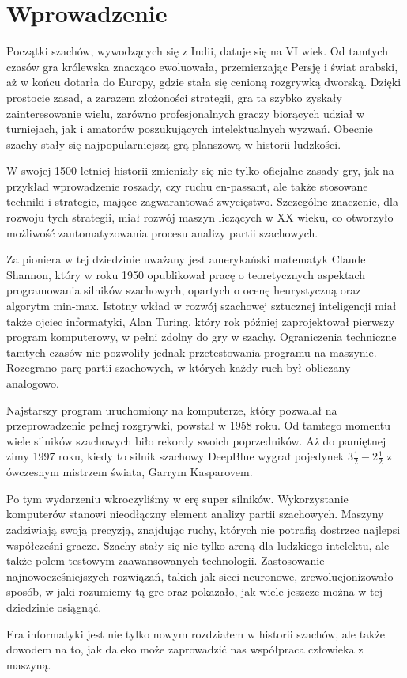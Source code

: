 \section{Wprowadzenie}
\label{sec:wprowadzenie}

Początki szachów, wywodzących się z Indii, datuje się na VI wiek.
Od tamtych czasów gra królewska znacząco ewoluowała, przemierzając Persję i świat arabski, aż w końcu dotarła do Europy, gdzie stała się cenioną rozgrywką dworską.
Dzięki prostocie zasad, a zarazem złożoności strategii, gra ta szybko zyskały zainteresowanie wielu, zarówno profesjonalnych graczy biorących udział w turniejach, jak i amatorów poszukujących intelektualnych wyzwań.
Obecnie szachy stały się najpopularniejszą grą planszową w historii ludzkości.


W swojej 1500-letniej historii zmieniały się nie tylko oficjalne zasady gry, jak na przykład wprowadzenie roszady, czy ruchu en-passant, ale także stosowane techniki i strategie, mające zagwarantować zwycięstwo.
Szczególne znaczenie, dla rozwoju tych strategii, miał rozwój maszyn liczących w XX wieku, co otworzyło możliwość zautomatyzowania procesu analizy partii szachowych.


Za pioniera w tej dziedzinie uważany jest amerykański matematyk Claude Shannon, który w roku 1950 opublikował pracę o teoretycznych aspektach programowania silników szachowych, opartych o ocenę heurystyczną oraz algorytm min-max.
Istotny wkład w rozwój szachowej sztucznej inteligencji miał także ojciec informatyki, Alan Turing, który rok później zaprojektował pierwszy program komputerowy, w pełni zdolny do gry w szachy.
Ograniczenia techniczne tamtych czasów nie pozwoliły jednak przetestowania programu na maszynie.
Rozegrano parę partii szachowych, w których każdy ruch był obliczany analogowo.


Najstarszy program uruchomiony na komputerze, który pozwalał na przeprowadzenie pełnej rozgrywki, powstał w 1958 roku.
Od tamtego momentu wiele silników szachowych biło rekordy swoich poprzedników.
Aż do pamiętnej zimy 1997 roku, kiedy to silnik szachowy DeepBlue wygrał pojedynek $3\frac{1}{2} - 2\frac{1}{2}$ z ówczesnym mistrzem świata, Garrym Kasparovem.


Po tym wydarzeniu wkroczyliśmy w erę super silników.
Wykorzystanie komputerów stanowi nieodłączny element analizy partii szachowych.
Maszyny zadziwiają swoją precyzją, znajdując ruchy, których nie potrafią dostrzec najlepsi współcześni gracze.
Szachy stały się nie tylko areną dla ludzkiego intelektu, ale także polem testowym zaawansowanych technologii.
Zastosowanie najnowocześniejszych rozwiązań, takich jak sieci neuronowe, zrewolucjonizowało sposób, w jaki rozumiemy tą gre oraz pokazało, jak wiele jeszcze można w tej dziedzinie osiągnąć.

Era informatyki jest nie tylko nowym rozdziałem w historii szachów, ale także dowodem na to, jak daleko może zaprowadzić nas współpraca człowieka z maszyną.
